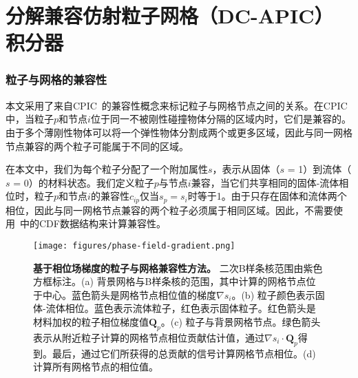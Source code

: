 \chapter{分解兼容仿射粒子网格（DC-APIC）积分器} \label{chap:dcapic}

\subsection{粒子与网格的兼容性}

本文采用了来自CPIC~\cite{hu2018moving}的兼容性概念来标记粒子与网格节点之间的关系。在CPIC中，当粒子$p$和节点$i$位于同一不被刚性碰撞物体分隔的区域内时，它们是兼容的。由于多个薄刚性物体可以将一个弹性物体分割成两个或更多区域，因此与同一网格节点兼容的两个粒子可能属于不同的区域。

在本文中，我们为每个粒子分配了一个附加属性$s$，表示从固体（$s$ = 1）到流体（$s$ = 0）的材料状态。我们定义粒子$p$与节点$i$兼容，当它们共享相同的固体-流体相位时，粒子$p$和节点$i$的兼容性$c_{ip}$仅当$s_p = s_i$时等于1。由于只存在固体和流体两个相位，因此与同一网格节点兼容的两个粒子必须属于相同区域。因此，不需要使用~\cite{hu2018moving}中的CDF数据结构来计算兼容性。

\begin{figure}[htbp]
    \centering
    \texttt{[image: figures/phase-field-gradient.png]}
    \caption{\textbf{基于相位场梯度的粒子与网格兼容性方法。} 二次B样条核范围由紫色方框标注。(a) 背景网格与B样条核的范围，其中计算的网格节点位于中心。蓝色箭头是网格节点相位值的梯度$\nabla s_i$。(b) 粒子颜色表示固体-流体相位。蓝色表示流体粒子，红色表示固体粒子。红色箭头是材料加权的粒子相位梯度值$\mathbf{Q}_p$。(c) 粒子与背景网格节点。绿色箭头表示从附近粒子计算的网格节点相位贡献估计值，通过$\nabla s_i\cdot \mathbf{Q}_p$得到。最后，通过它们所获得的总贡献的信号计算网格节点相位。(d) 计算所有网格节点的相位值。}
    \label{fig:phase-field-gradient}
\end{figure}

